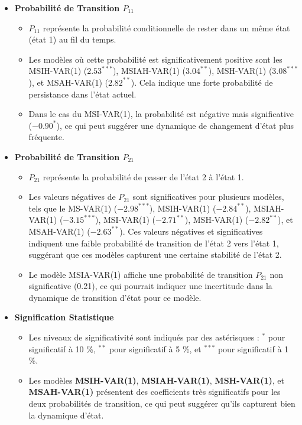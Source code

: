 \begin{itemize}
    \item \textbf{Probabilité de Transition \( P_{11} \)}
    \begin{itemize}
        \item \( P_{11} \) représente la probabilité conditionnelle de rester dans un même état (état 1) au fil du temps.
        \item Les modèles où cette probabilité est significativement positive sont les MSIH-VAR(1) (\( 2.53^{***} \)), MSIAH-VAR(1) (\( 3.04^{**} \)), MSH-VAR(1) (\( 3.08^{***} \)), et MSAH-VAR(1) (\( 2.82^{**} \)). Cela indique une forte probabilité de persistance dans l'état actuel.
        \item Dans le cas du MSI-VAR(1), la probabilité est négative mais significative (\( -0.90^{*} \)), ce qui peut suggérer une dynamique de changement d’état plus fréquente.
    \end{itemize}

    \item \textbf{Probabilité de Transition \( P_{21} \)}
    \begin{itemize}
        \item \( P_{21} \) représente la probabilité de passer de l’état 2 à l’état 1.
        \item Les valeurs négatives de \( P_{21}\) sont significatives pour plusieurs modèles, tels que le MS-VAR(1) (\( -2.98^{***} \)), MSIH-VAR(1) (\( -2.84^{**} \)), MSIAH-VAR(1) (\( -3.15^{***} \)), MSI-VAR(1) (\( -2.71^{**} \)), MSH-VAR(1) (\( -2.82^{**} \)), et MSAH-VAR(1) (\( -2.63^{**} \)). Ces valeurs négatives et significatives indiquent une faible probabilité de transition de l’état 2 vers l’état 1, suggérant que ces modèles capturent une certaine stabilité de l’état 2.
        \item Le modèle MSIA-VAR(1) affiche une probabilité de transition \( P_{21} \) non significative (0.21), ce qui pourrait indiquer une incertitude dans la dynamique de transition d’état pour ce modèle.
    \end{itemize}

    \item \textbf{Signification Statistique}
    \begin{itemize}
        \item Les niveaux de significativité sont indiqués par des astérisques : \( ^{*} \) pour significatif à 10 \%, \( ^{**} \) pour significatif à 5 \%, et \( ^{***} \) pour significatif à 1 \%.
        \item Les modèles \textbf{MSIH-VAR(1)}, \textbf{MSIAH-VAR(1)}, \textbf{MSH-VAR(1)}, et \textbf{MSAH-VAR(1)} présentent des coefficients très significatifs pour les deux probabilités de transition, ce qui peut suggérer qu'ils capturent bien la dynamique d'état.
    \end{itemize}
\end{itemize}

